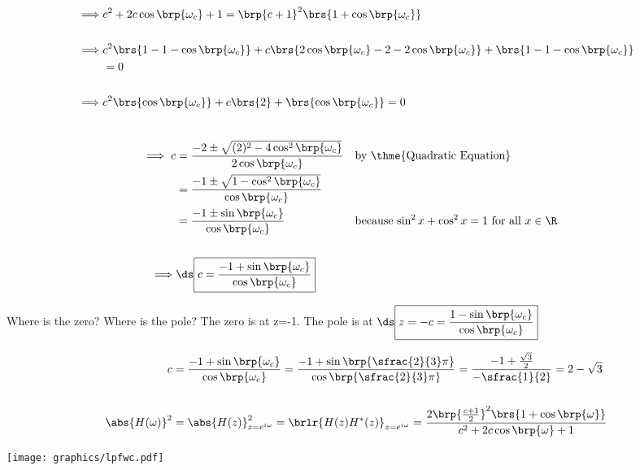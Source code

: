 {\begin{align*}
    \implies &c^2 + 2 c\cos\brp{\omega_c} + 1 
             = \brp{c+1}^2\brs{1 +  \cos\brp{\omega_c}}
  \\\\\implies & c^2\brs{1-1-\cos\brp{\omega_c}} 
             + c  \brs{2\cos\brp{\omega_c}-2-2\cos\brp{\omega_c}}
             +    \brs{1-1-\cos\brp{\omega_c}}
             \\&= 0
  \\\\\implies & c^2\brs{\cos\brp{\omega_c}} 
             + c  \brs{2}
             +    \brs{\cos\brp{\omega_c}}
             = 0
\end{align*}}



{\begin{align*}
  \\\implies c &= \frac{-2 \pm \sqrt{(2)^2 -4\cos^2\brp{\omega_c}}}
                       {2\cos\brp{\omega_c}}
               && \text{by \thme{Quadratic Equation}}
             \\&= \frac{-1 \pm \sqrt{1 -\cos^2\brp{\omega_c}}}
                       {\cos\brp{\omega_c}}
             \\&= \frac{-1 \pm \sin\brp{\omega_c}}
                       {\cos\brp{\omega_c}}
               && \text{because $\sin^2x + \cos^2x = 1$ for all $x\in\R$}
  \\
  \\\implies &\ds\boxed{c = \frac{-1 + \sin\brp{\omega_c}}
                    {\cos\brp{\omega_c}}}
\end{align*}}

Where is the zero? Where is the pole?
The zero is at z=-1. \qquad The pole is at 
$\ds\boxed{z=-c = \frac{1 - \sin\brp{\omega_c}}
                    {\cos\brp{\omega_c}}}$

\begin{example}[\exmd{1st order low-pass with corner frequency $\omega_c=\frac{2}{3}\pi$}]
{\begin{align*}
  c &= \frac{-1 + \sin\brp{\omega_c}}{\cos\brp{\omega_c}}
     = \frac{-1 + \sin\brp{\sfrac{2}{3}\pi}}{\cos\brp{\sfrac{2}{3}\pi}}
     = \frac{-1 + \frac{\sqrt{3}}{2}}{-\sfrac{1}{2}}
     = 2 - \sqrt{3}
  \\
  \\
  \abs{H(\omega)}^2
    &= \abs{H(z)}^2_{z=e^{i\omega}}
     = \brlr{H(z)H^\ast(z)}_{z=e^{i\omega}}
     = \frac{2\brp{\frac{c+1}{2}}^2\brs{1 +  \cos\brp{\omega}}}
            {c^2 + 2 c\cos\brp{\omega} + 1}
\end{align*}}

\texttt{[image: graphics/lpfwc.pdf]}
\end{example}



